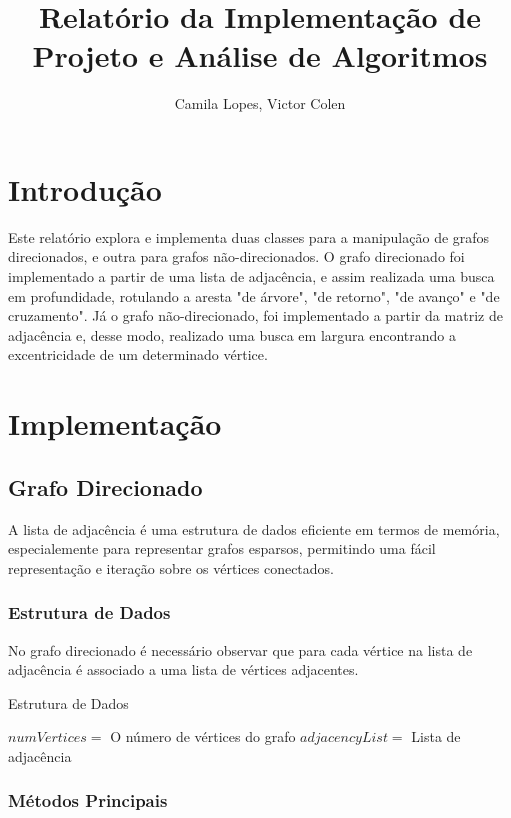 \documentclass[12pt]{article}
\title{Relatório da Implementação de Projeto e Análise de Algoritmos}
\author{Camila Lopes\inst{1}, Victor Colen\inst{1} }
\begin{document}
 

\maketitle

\section{Introdução}

Este relatório explora e implementa duas classes para a manipulação de grafos direcionados, e outra para grafos não-direcionados. O grafo direcionado foi implementado a partir de  uma lista de adjacência, e assim  realizada uma busca em profundidade, rotulando a aresta "de árvore", "de retorno", "de avanço" e "de cruzamento". Já o grafo não-direcionado, foi implementado a partir da matriz de adjacência e, desse modo, realizado uma busca em largura encontrando a excentricidade de um determinado vértice.

\section{Implementação}

\subsection{Grafo Direcionado}

A lista de adjacência é uma estrutura de dados eficiente em termos de memória, especialemente para representar grafos esparsos, permitindo uma fácil representação e iteração sobre os vértices conectados.

\subsubsection{Estrutura de Dados}
No grafo direcionado é necessário observar que para cada vértice na lista de adjacência é associado a uma lista de vértices adjacentes.

\begin{algorithm}
    \caption{Estrutura de Dados}
    \label{alg:estruturaDeDados_GD}
    \begin{algorithmic}
        \State $numVertices =$ O número de vértices do grafo 
        \State $adjacencyList =$ Lista de adjacência
    \end{algorithmic}
\end{algorithm}

\subsubsection{Métodos Principais}
\end{document}
